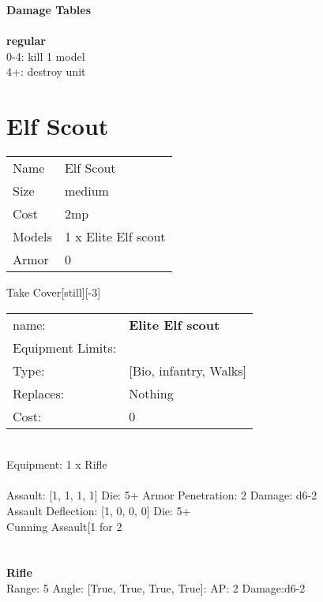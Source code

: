 {\bf Damage Tables} \\
\ \\ {\bf regular } \\
0-4: kill 1 model \\
4+: destroy unit \\










\pagebreak\pagebreak

\section{ Elf Scout }

\begin{tabular}{ll}
  Name & Elf Scout \\
  Size & medium\\
  Cost & 2mp\\
  Models & 1 x Elite Elf scout\\
  Armor & 0\\
\end{tabular}

\noindent Take Cover[still][-3]\\ 


\noindent
\begin{tabular}{ll}
name: &{\bf Elite Elf scout } \\
Equipment Limits: & \\
Type: &[Bio, infantry, Walks] \\
Replaces: &Nothing \\
Cost: & 0\\
\end{tabular}
\ \\
Equipment: 1 x Rifle \\
\ \\
Assault: [1, 1, 1, 1] Die: 5+ Armor Penetration: 2 Damage: d6-2 \\
Assault Deflection: [1, 0, 0, 0] Die: 5+\\
\indent Cunning Assault[1 for 2\\ 
 
\ \\

\ \\
{\bf Rifle } \\



Range: 5  Angle: [True, True, True, True]: AP: 2 Damage:d6-2 \\




